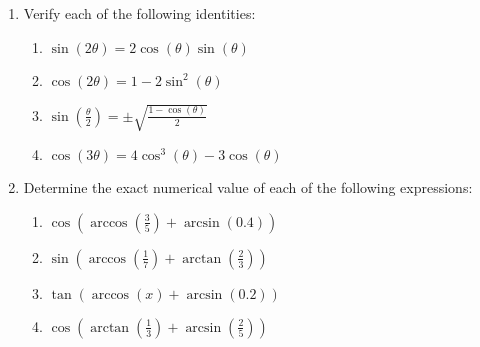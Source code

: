 
\begin{enumerate}
\item Verify each of the following identities:
  \begin{enumerate}
  \item ${\displaystyle \sin(2\theta) = 2\cos(\theta)\sin(\theta) }$
  \item ${\displaystyle \cos(2\theta) = 1 - 2\sin^2(\theta) }$
  \item ${\displaystyle \sin\left(\frac{\theta}{2}\right) = \pm\sqrt{\frac{1-\cos(\theta)}{2}} }$
  \item ${\displaystyle \cos(3\theta)=4\cos^3(\theta)-3\cos(\theta)}$
  \end{enumerate}
\item Determine the exact numerical value of each of the following
  expressions:
  \begin{enumerate}
  \item ${\displaystyle \cos\left(\arccos\left(\frac{3}{5}\right)+\arcsin\left(0.4\right)\right) }$
  \item ${\displaystyle \sin\left(\arccos\left(\frac{1}{7}\right)+\arctan\left(\frac{2}{3}\right)\right)}$
  \item ${\displaystyle \tan\left(\arccos\left(x\right)+\arcsin\left(0.2\right)\right)}$
  \item ${\displaystyle \cos\left(\arctan\left(\frac{1}{3}\right)+\arcsin\left(\frac{2}{5}\right)\right)}$
  \end{enumerate}
\end{enumerate}
